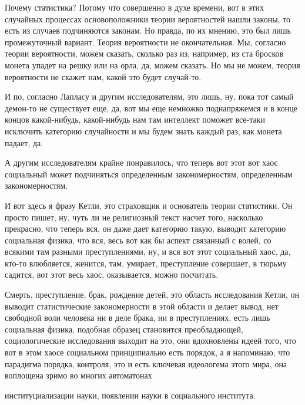 Почему статистика? Потому что
совершенно в духе времени, вот в этих случайных процессах основоположники теории
вероятностей нашли законы, то есть из случаев подчиняются законам. Но правда, по
их мнению, это был лишь промежуточный вариант. Теория вероятности не
окончательная. Мы, согласно теории вероятности, можем сказать, сколько раз из,
например, из ста бросков монета упадет на решку или на орла, да, можем сказать.
Но мы не можем, теория вероятности не скажет нам, какой это будет случай-то. 

И
по, согласно Лапласу и другим исследователям, это лишь, ну, пока тот самый
демон-то не существует еще, да, вот мы еще немножко поднапряжемся и в конце
концов какой-нибудь, какой-нибудь нам там интеллект поможет все-таки исключить
категорию случайности и мы будем знать каждый раз, как монета падает, да. 

А
другим исследователям крайне понравилось, что теперь вот этот вот хаос
социальный может подчиняться определенным закономерностям, определенным
закономерностям. 

И вот здесь я фразу Кетли, это страховщик и основатель теории
статистики. Он просто пишет, ну, чуть ли не религиозный текст насчет того,
насколько прекрасно, что теперь вся, он даже дает категорию такую, выводит
категорию социальная физика, что вся, весь вот как бы аспект связанный с волей,
со всякими там разными преступлениями, ну, и вся вот этот социальный хаос, да,
кто-то влюбляется, женится, там, умирает, преступление совершает, в тюрьму
садится, вот этот весь хаос, оказывается, можно посчитать. 

Смерть, преступление,
брак, рождение детей, это область исследования Кетли, он выводит статистические
закономерности в этой области и делает вывод, нет свободной воли человека ни в
деле брака, ни в преступлениях, есть лишь социальная физика, подобная образец
становится преобладающей, социологические исследования выходит на это, они
вдохновлены идеей того, что вот в этом хаосе социальном принципиально есть
порядок,
а я напоминаю, что парадигма порядка, контроля, это и есть ключевая
идеологема этого мира, она воплощена зримо во многих автоматонах


институциализации науки, появлении науки в социального института.

